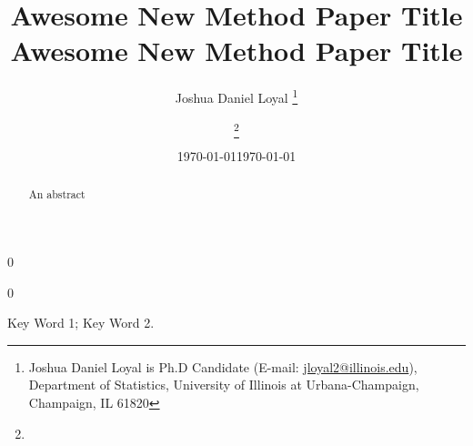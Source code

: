 \documentclass[11pt]{article}
\newcommand{\blind}{0}
\begin{document}
\blind
{
\title{ Awesome New Method Paper Title }

\author{
Joshua Daniel Loyal \thanks{Joshua Daniel Loyal is Ph.D Candidate (E-mail: \href{mailto:jloyal2@illinois.edu}{jloyal2@illinois.edu}), Department of Statistics, University of Illinois at Urbana-Champaign, Champaign, IL 61820}
}

\date{\today}
\maketitle
}
\fi
{}\blind
{
\title{ Awesome New Method Paper Title }

\author{\thanks{\vspace{2em}}}

\date{\today}
\maketitle
}\fi

\begin{abstract}
An abstract
\end{abstract}

Key Word 1; Key Word 2.



















\clearpage


\end{document}
